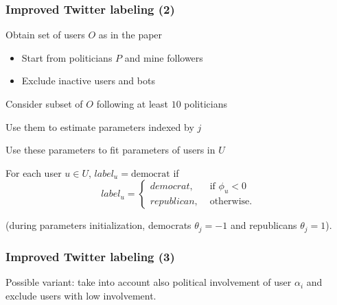 \documentclass{beamer}
\begin{document}
\begin{frame}[c]
    \frametitle{Improved Twitter labeling (2)}
    \begin{enumerate}
        \item Obtain set of users $O$ as in the paper
            \begin{itemize}
                \item Start from politicians $P$ and mine followers
                \item Exclude inactive users and bots
            \end{itemize}
        \item Consider subset of $O$ following at least $10$ politicians
        \item Use them to estimate parameters indexed by $j$ \pause
        \item {\color{blue} Use these parameters to fit parameters of users
            in $U$
        \item For each user $u \in U$, $label_u = \text{democrat}$ if 
            \begin{equation}
                label_u = \begin{cases}
                    democrat, &\text{ if }\phi_u < 0\\
                    republican, &\text{ otherwise}.
                \end{cases}
            \end{equation}}
            (during parameters initialization, democrats $\theta _j = -1$ and republicans $\theta_j = 1$).
    \end{enumerate}
\end{frame}

\begin{frame}[c]
    \frametitle{Improved Twitter labeling (3)}
    Possible variant: take into account also political involvement of user
    $\alpha _i$ and exclude users with low involvement.
\end{frame}
\end{document}
